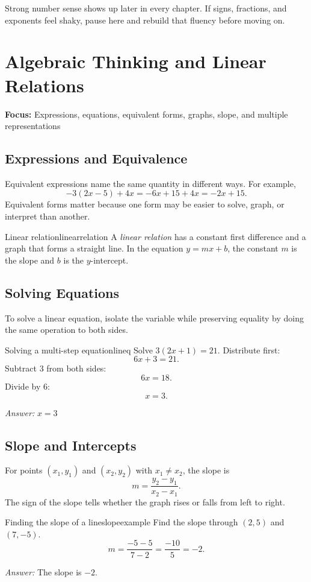 \documentclass[11pt,oneside]{book}
\newcommand{\topicline}[1]{\medskip\noindent\textbf{Focus:} #1\par\medskip}
\newcommand{\answerline}{\par\smallskip\noindent\textit{Answer: }}
\begin{document}
\begin{summarybox}
Strong number sense shows up later in every chapter. If signs, fractions, and exponents feel shaky, pause here and rebuild that fluency before moving on.
\end{summarybox}

\chapter{Algebraic Thinking and Linear Relations}
\topicline{Expressions, equations, equivalent forms, graphs, slope, and multiple representations}

\section{Expressions and Equivalence}
Equivalent expressions name the same quantity in different ways. For example,
\[
-3(2x-5)+4x=-6x+15+4x=-2x+15.
\]
Equivalent forms matter because one form may be easier to solve, graph, or interpret than another.

\begin{definition}{Linear relation}{linearrelation}
A \emph{linear relation} has a constant first difference and a graph that forms a straight line. In the equation $y=mx+b$, the constant $m$ is the slope and $b$ is the $y$-intercept.
\end{definition}

\section{Solving Equations}
To solve a linear equation, isolate the variable while preserving equality by doing the same operation to both sides.

\begin{example}{Solving a multi-step equation}{lineq}
Solve $3(2x+1)=21$.
\tcblower
Distribute first:
\[
6x+3=21.
\]
Subtract $3$ from both sides:
\[
6x=18.
\]
Divide by $6$:
\[
x=3.
\]
\answerline $x=3$
\end{example}

\section{Slope and Intercepts}
For points $(x_1,y_1)$ and $(x_2,y_2)$ with $x_1\neq x_2$, the slope is
\[
 m=\frac{y_2-y_1}{x_2-x_1}.
\]
The sign of the slope tells whether the graph rises or falls from left to right.

\begin{example}{Finding the slope of a line}{slopeexample}
Find the slope through $(2,5)$ and $(7,-5)$.
\tcblower
\[
 m=\frac{-5-5}{7-2}=\frac{-10}{5}=-2.
\]
\answerline The slope is $-2$.
\end{example}
\end{document}
